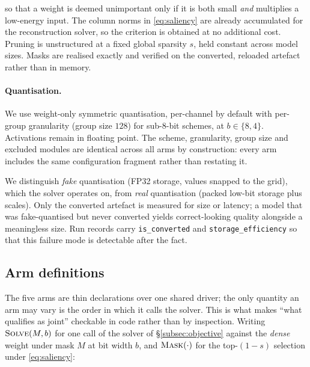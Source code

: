 so that a weight is deemed unimportant only if it is both small \emph{and} multiplies a
low-energy input. The column norms in \eqref{eq:saliency} are already accumulated for the
reconstruction solver, so the criterion is obtained at no additional cost. Pruning is
unstructured at a fixed global sparsity $s$, held constant across model sizes. Masks are
realised exactly and verified on the converted, reloaded artefact rather than in memory.

\paragraph{Quantisation.} We use weight-only symmetric quantisation, per-channel by default
with per-group granularity (group size $128$) for sub-8-bit schemes, at $b \in \{8, 4\}$.
Activations remain in floating point. The scheme, granularity, group size and excluded
modules are identical across all arms by construction: every arm includes the same
configuration fragment rather than restating it.

We distinguish \emph{fake} quantisation (FP32 storage, values snapped to the grid), which
the solver operates on, from \emph{real} quantisation (packed low-bit storage plus scales).
Only the converted artefact is measured for size or latency; a model that was fake-quantised
but never converted yields correct-looking quality alongside a meaningless size. Run records
carry \texttt{is\_converted} and \texttt{storage\_efficiency} so that this failure mode is
detectable after the fact.

\subsection{Arm definitions}
\label{subsec:arms}

The five arms are thin declarations over one shared driver; the only quantity an arm may
vary is the order in which it calls the solver. This is what makes ``what qualifies as
joint'' checkable in code rather than by inspection. Writing $\textsc{Solve}(M, b)$ for one
call of the solver of \S\ref{subsec:objective} against the \emph{dense} weight under mask
$M$ at bit width $b$, and $\textsc{Mask}(\cdot)$ for the top-$(1{-}s)$ selection under
\eqref{eq:saliency}:

